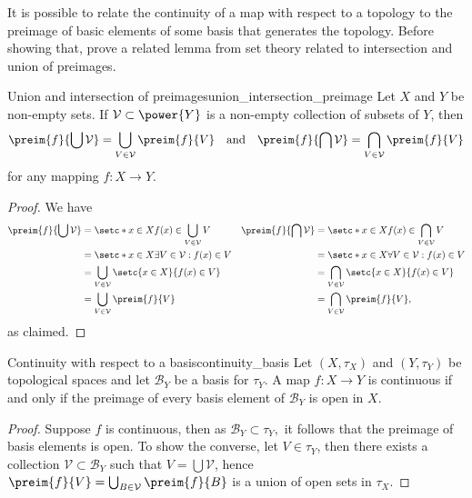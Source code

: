 It is possible to relate the continuity of a map with respect to a topology to the preimage of basic elements of some basis that generates the topology. Before showing that, prove a related lemma from set theory related to intersection and union of preimages.
\begin{lemma}{Union and intersection of preimages}{union_intersection_preimage}
    Let \(X\) and \(Y\) be non-empty sets. If \(\mathcal{V} \subset \power{Y}\) is a non-empty collection of subsets of \(Y\), then
    \begin{equation*}
        \preim{f}{\bigcup \mathcal{V}} = \bigcup_{V \in \mathcal{V}} \preim{f}{V}
        \quad\text{and}\quad
        \preim{f}{\bigcap \mathcal{V}} = \bigcap_{V \in \mathcal{V}} \preim{f}{V}
    \end{equation*}
    for any mapping \(f : X \to Y\).
\end{lemma}
\begin{proof}
    We have
    \begin{align*}
        \preim{f}{\bigcup \mathcal{V}} &= \setc*{x \in X}{f(x) \in \bigcup_{V \in \mathcal{V}} V}&
        \preim{f}{\bigcap \mathcal{V}} &= \setc*{x \in X}{f(x) \in \bigcap_{V \in \mathcal{V}} V}\\
                                        &= \setc*{x \in X}{\exists V \in \mathcal{V} : f(x) \in V}&
                                        &= \setc*{x \in X}{\forall V \in \mathcal{V} : f(x) \in V}\\
                                        &= \bigcup_{V \in \mathcal{V}} \setc{x \in X}{f(x) \in V}&
                                        &= \bigcap_{V \in \mathcal{V}} \setc{x \in X}{f(x) \in V}\\
                                        &= \bigcup_{V \in \mathcal{V}} \preim{f}{V}&
                                        &= \bigcap_{V \in \mathcal{V}} \preim{f}{V},
    \end{align*}
    as claimed.
\end{proof}

\begin{proposition}{Continuity with respect to a basis}{continuity_basis}
    Let \((X, \tau_X)\) and \((Y,\tau_Y)\) be topological spaces and let \(\mathcal{B}_Y\) be a basis for \(\tau_Y\). A map \(f : X \to Y\) is continuous if and only if the preimage of every basis element of \(\mathcal{B}_Y\) is open in \(X\).
\end{proposition}
\begin{proof}
    Suppose \(f\) is continuous, then as \(\mathcal{B}_Y \subset \tau_Y,\) it follows that the preimage of basis elements is open. To show the converse, let \(V \in \tau_Y\), then there exists a collection \(\mathcal{V} \subset \mathcal{B}_Y\) such that \(V = \bigcup \mathcal{V}\), hence \(\preim{f}{V} = \bigcup_{B \in \mathcal{V}} \preim{f}{B}\) is a union of open sets in \(\tau_X\).
\end{proof}

